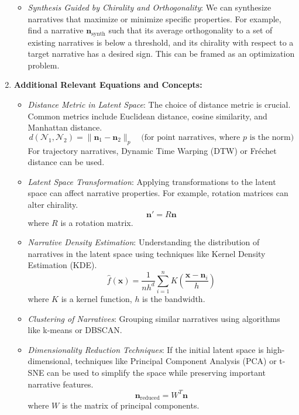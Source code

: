 \documentclass[12pt, a4paper]{article}
\begin{document}
\begin{enumerate}
\begin{itemize}
    \item \textit{Synthesis Guided by Chirality and Orthogonality}:  We can synthesize narratives that maximize or minimize specific properties. For example, find a narrative $\mathbf{n}_{\text{synth}}$ such that its average orthogonality to a set of existing narratives is below a threshold, and its chirality with respect to a target narrative has a desired sign. This can be framed as an optimization problem.
\end{itemize}

\item \textbf{Additional Relevant Equations and Concepts:}

\begin{itemize}
    \item \textit{Distance Metric in Latent Space}: The choice of distance metric is crucial. Common metrics include Euclidean distance, cosine similarity, and Manhattan distance.
    \begin{equation*}
        d(\mathcal{N}_1, \mathcal{N}_2) = \|\mathbf{n}_1 - \mathbf{n}_2\|_p  \quad \text{(for point narratives, where } p \text{ is the norm)}
    \end{equation*}
    For trajectory narratives, Dynamic Time Warping (DTW) or Fréchet distance can be used.

    \item \textit{Latent Space Transformation}:  Applying transformations to the latent space can affect narrative properties. For example, rotation matrices can alter chirality.
    \begin{equation*}
        \mathbf{n}' = R \mathbf{n}
    \end{equation*}
    where $R$ is a rotation matrix.

    \item \textit{Narrative Density Estimation}: Understanding the distribution of narratives in the latent space using techniques like Kernel Density Estimation (KDE).
    \begin{equation*}
        \hat{f}(\mathbf{x}) = \frac{1}{nh^d} \sum_{i=1}^n K\left(\frac{\mathbf{x} - \mathbf{n}_i}{h}\right)
    \end{equation*}
    where $K$ is a kernel function, $h$ is the bandwidth.

    \item \textit{Clustering of Narratives}: Grouping similar narratives using algorithms like k-means or DBSCAN.

    \item \textit{Dimensionality Reduction Techniques}: If the initial latent space is high-dimensional, techniques like Principal Component Analysis (PCA) or t-SNE can be used to simplify the space while preserving important narrative features.
    \begin{equation*}
        \mathbf{n}_{\text{reduced}} = W^T \mathbf{n}
    \end{equation*}
    where $W$ is the matrix of principal components.
\end{itemize}
\end{enumerate}
\end{document}
